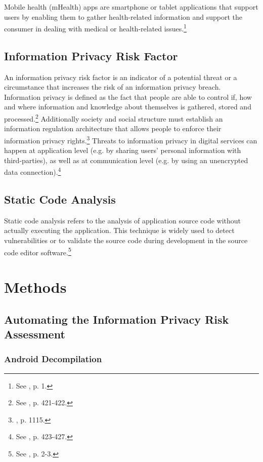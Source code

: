 \documentclass[
	a4paper,
	oneside,
	12pt,
	liststotocnumbered
]{article}
\let\cite\textcite
\begin{document}
Mobile health (\acs{mHealth}) apps are smartphone or tablet applications that support users by enabling them to gather health-related information and support the consumer in dealing with medical or health-related issues.\footnote{See \cite{Dehling2015b}, p. 1.}

\subsection{Information Privacy Risk Factor}
An information privacy risk factor is an indicator of a potential threat or a circumstance that increases the risk of an information privacy breach.
Information privacy is defined as the fact that people are able to control if, how and where information and knowledge about themselves is gathered, stored and processed.\footnote{See \cite{Fischer1998}, p. 421-422.}
Additionally society and social structure must establish an information regulation architecture that allows people to enforce their information privacy rights.\footnote{\cite{Solove2002}, p. 1115.}
Threats to information privacy in digital services can happen at application level (e.g. by sharing users' personal information with third-parties), as well as at communication level (e.g. by using an unencrypted data connection).\footnote{See \cite{Fischer1998}, p. 423-427.}
\subsection{Static Code Analysis}

Static code analysis refers to the analysis of application source code without actually executing the application. 
This technique is widely used to detect vulnerabilities or to validate the source code during development in the source code editor software.\footnote{See \cite{Bardas2010}, p. 2-3.}

\section{Methods}

\subsection{Automating the Information Privacy Risk Assessment}

\subsubsection{Android Decompilation}
\end{document}
